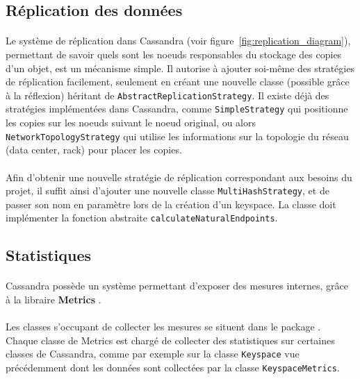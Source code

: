 \documentclass[12pt]{article}
\newcommand{\class}[1]{\texttt{#1}}
\begin{document}
\subsection{Réplication des données}

\paragraph{}Le système de réplication dans Cassandra (voir figure~\ref{fig:replication_diagram}), permettant de savoir quels sont les noeuds responsables du stockage des copies d'un objet, est un mécanisme simple. Il autorise à ajouter soi-même des stratégies de réplication facilement, seulement en créant une nouvelle classe (possible grâce à la réflexion) héritant de \class{AbstractReplicationStrategy}. Il existe déjà des stratégies implémentées dans Cassandra, comme \class{SimpleStrategy} qui positionne les copies sur les noeuds suivant le noeud original, ou alors \class{NetworkTopologyStrategy} qui utilise les informations sur la topologie du réseau (data center, rack) pour placer les copies.

\paragraph{}Afin d'obtenir une nouvelle stratégie de réplication correspondant aux besoins du projet, il suffit ainsi d'ajouter une nouvelle classe \class{MultiHashStrategy}, et de passer son nom en paramètre lors de la création d'un keyspace. La classe doit implémenter la fonction abstraite \texttt{calculateNaturalEndpoints}.

\subsection{Statistiques}

\paragraph{} Cassandra possède un système permettant d'exposer des mesures internes, grâce à la libraire \textbf{Metrics} \cite{Metrics2010}.

\paragraph{} Les classes s'occupant de collecter les mesures se situent dans le package . Chaque classe de Metrics est chargé de collecter des statistiques sur certaines classes de Cassandra, comme par exemple sur la classe \class{Keyspace} vue précédemment dont les données sont collectées par la classe \class{KeyspaceMetrics}.
\end{document}
